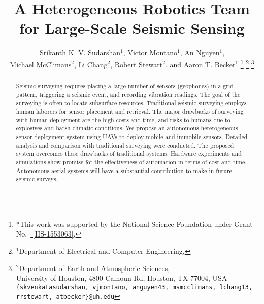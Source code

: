 \documentclass[letterpaper, 10 pt, conference]{ieeeconf}
\begin{document}
%
\title{\LARGE \bf A Heterogeneous Robotics Team for Large-Scale Seismic Sensing} 

\author{Srikanth K. V. Sudarshan$^{1}$,
Victor Montano$^{1}$,
An Nguyen$^{1}$,\\ 
Michael McClimans$^{2}$,
Li Chang$^{2}$,
Robert Stewart$^{2}$, and
 Aaron T. Becker$^{1}$%
\thanks{*This work was supported by the National Science Foundation under Grant No.\ \href{http://nsf.gov/awardsearch/showAward?AWD_ID=1553063}{ [IIS-1553063]}.}%
\thanks{$^{1}$Department of Electrical and Computer Engineering,}
\thanks{$^{2}$Department of Earth and Atmospheric Sciences,\\ University of Houston, 4800 Calhoun Rd, Houston, TX 77004, USA
        {\tt\small \{skvenkatasudarshan, vjmontano, anguyen43, msmcclimans, lchang13, rrstewart, atbecker\}@uh.edu}}%
}



\maketitle
\thispagestyle{empty}
\pagestyle{empty}


\begin{abstract} 
Seismic surveying requires placing a large number of sensors (geophones) in a grid pattern, triggering a seismic event, and recording vibration readings. 
 The goal of the surveying is often to locate subsurface resources.  
Traditional seismic surveying employs human laborers for sensor placement and retrieval. 
The major drawbacks of surveying with human deployment are the high costs and time, and risks to humans due to explosives and harsh climatic conditions.
We propose an autonomous heterogeneous sensor deployment system using UAVs to deploy mobile and immobile sensors.
Detailed analysis and comparison with traditional surveying were conducted. 
The proposed system overcomes these drawbacks of traditional systems.
Hardware experiments and simulations show promise for the effectiveness of automation in terms of cost and time. 
 Autonomous aerial systems will have a substantial contribution to make in future seismic surveys. 
\end{abstract}


%

%

%

%

%

%






\end{document}
